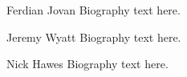 \documentclass[journal]{IEEEtran}
\begin{document}
\ifCLASSOPTIONcaptionsoff
  \newpage
\fi






\begin{IEEEbiographynophoto}{Ferdian Jovan}
Biography text here.
\end{IEEEbiographynophoto}

\begin{IEEEbiographynophoto}{Jeremy Wyatt}
Biography text here.
\end{IEEEbiographynophoto}

\begin{IEEEbiographynophoto}{Nick Hawes}
Biography text here.
\end{IEEEbiographynophoto}

% 



\end{document}
